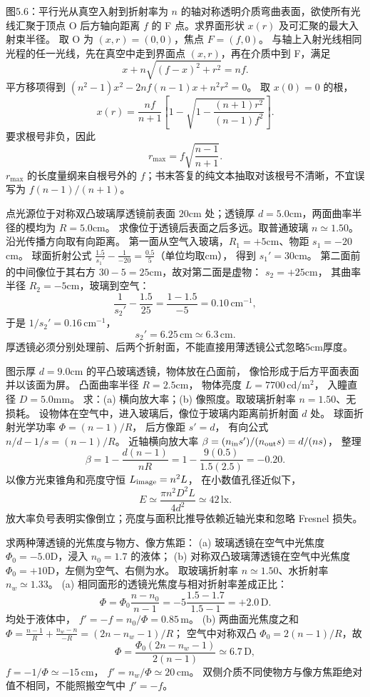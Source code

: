 图5.6：平行光从真空入射到折射率为 $n$ 的轴对称透明介质弯曲表面，欲使所有光线汇聚于顶点 O 后方轴向距离 $f$ 的 F 点。求界面形状 $x(r)$ 及可汇聚的最大入射束半径。
\exsolution
取 O 为 $(x,r)=(0,0)$，焦点 $F=(f,0)$。
与轴上入射光线相同光程的任一光线，先在真空中走到界面点 $(x,r)$，再在介质中到 F，满足
\[
x+n\sqrt{(f-x)^2+r^2}=nf.
\]
平方移项得到
$(n^2-1)x^2-2nf(n-1)x+n^2r^2=0$。
取 $x(0)=0$ 的根，
\[
\boxed{x(r)=\frac{nf}{n+1}
\left[1-\sqrt{1-\frac{(n+1)r^2}{(n-1)f^2}}\right]}.
\]
要求根号非负，因此
\[
\boxed{r_{\max}=f\sqrt{\frac{n-1}{n+1}}}.
\]
\excheck $r_{\max}$ 的长度量纲来自根号外的 $f$；书末答复的纯文本抽取对该根号不清晰，不宜误写为 $f(n-1)/(n+1)$。

点光源位于对称双凸玻璃厚透镜前表面
$20$cm 处；透镜厚 $d=5.0$cm，两面曲率半径的模均为
$R=5.0$cm。
求像位于透镜后表面之后多远。取普通玻璃
$n\simeq1.50$。
\exsolution
沿光传播方向取有向距离。
第一面从空气入玻璃，$R_1=+5$cm、物距 $s_1=-20$cm。
球面折射公式
$\frac{1.5}{s_1'}-\frac1{-20}
=\frac{0.5}{5}$（单位均取cm），
得到
$s_1'=30$cm。
第二面前的中间像位于其右方
$30-5=25$cm，故对第二面是虚物：
$s_2=+25$cm，
其曲率半径 $R_2=-5$cm，玻璃到空气：
\[
\frac1{s_2'}-\frac{1.5}{25}
=\frac{1-1.5}{-5}=0.10\,\mathrm{cm^{-1}},
\]
于是
$1/s_2'=0.16\,\mathrm{cm^{-1}}$，
\[
\boxed{s_2'=6.25\,\mathrm{cm}
\simeq6.3\,\mathrm{cm}}.
\]
\excheck 厚透镜必须分别处理前、后两个折射面，不能直接用薄透镜公式忽略5cm厚度。

图示厚 $d=9.0$cm 的平凸玻璃透镜，物体放在凸面前，
像恰形成于后方平面表面并以该面为屏。
凸面曲率半径 $R=2.5$cm，
物体亮度 $L=7700\,\mathrm{cd/m^2}$，
入瞳直径 $D=5.0$mm。
求：(a) 横向放大率；(b) 像照度。取玻璃折射率 $n=1.50$、无损耗。
\exsolution
设物体在空气中，进入玻璃后，像位于玻璃内距离前折射面 $d$ 处。
球面折射光学功率
$\Phi=(n-1)/R$，
后方像距 $s'=d$，
有向公式
$n/d-1/s=(n-1)/R$。
近轴横向放大率
$\beta=(n_{\rm in}s')/(n_{\rm out}s)
=d/(ns)$，
整理
\[
\boxed{\beta=1-\frac{d(n-1)}{nR}
=1-\frac{9(0.5)}{1.5(2.5)}
=-0.20}.
\]
以像方光束锥角和亮度守恒
$L_{\rm image}=n^2L$，
在小数值孔径近似下，
\[
\boxed{E\simeq\frac{\pi n^2D^2L}{4d^2}
\simeq42\,\mathrm{lx}}.
\]
\excheck 放大率负号表明实像倒立；亮度与面积比推导依赖近轴光束和忽略 Fresnel 损失。

求两种薄透镜的光焦度与物方、像方焦距：
(a) 玻璃透镜在空气中光焦度 $\Phi_0=-5.0$D，浸入
$n_0=1.7$ 的液体；
(b) 对称双凸玻璃薄透镜在空气中光焦度
$\Phi_0=+10$D，左侧为空气、右侧为水。
取玻璃折射率 $n\simeq1.50$、水折射率 $n_w\simeq1.33$。
\exsolution
(a) 相同面形的透镜光焦度与相对折射率差成正比：
\[
\Phi=\Phi_0\frac{n-n_0}{n-1}
=-5\frac{1.5-1.7}{1.5-1}=+2.0\,\mathrm D.
\]
均处于液体中，
$\boxed{f'=-f=n_0/\Phi=0.85\,\mathrm m}$。
(b) 两曲面光焦度之和
$\Phi=\frac{n-1}{R}+\frac{n_w-n}{-R}
=(2n-n_w-1)/R$；
空气中对称双凸 $\Phi_0=2(n-1)/R$，故
\[
\boxed{\Phi=\frac{\Phi_0(2n-n_w-1)}{2(n-1)}
\simeq6.7\,\mathrm D},
\]
$\boxed{f=-1/\Phi\simeq-15\,\mathrm{cm}}$，
$\boxed{f'=n_w/\Phi\simeq20\,\mathrm{cm}}$。
\excheck 双侧介质不同使物方与像方焦距绝对值不相同，不能照搬空气中 $f'=-f$。

